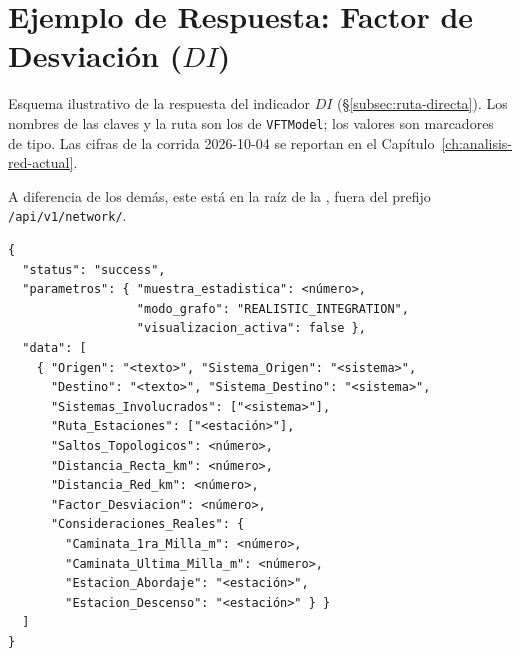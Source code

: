 
\section{Ejemplo de Respuesta: Factor de Desviación \texorpdfstring{($DI$)}{(DI)}}
\label{anx:vft-out-detour}

Esquema ilustrativo de la respuesta del indicador $DI$
(§\ref{subsec:ruta-directa}). Los nombres de las claves y la ruta son los
de \texttt{VFTModel}; los valores son marcadores de tipo. Las cifras de la
corrida 2026-10-04 se reportan en el Capítulo~\ref{ch:analisis-red-actual}.

A diferencia de los demás, este  está en la raíz de la \api{},
fuera del prefijo \texttt{/api/v1/network/}.

\begin{lstlisting}[style=estiloPython,
  caption={Esquema de respuesta del endpoint \texttt{/get\_detour\_factor}
           (ilustrativo; \texttt{visualize} = falso).},
  label=lst:out-detour]
{
  "status": "success",
  "parametros": { "muestra_estadistica": <número>,
                  "modo_grafo": "REALISTIC_INTEGRATION",
                  "visualizacion_activa": false },
  "data": [
    { "Origen": "<texto>", "Sistema_Origen": "<sistema>",
      "Destino": "<texto>", "Sistema_Destino": "<sistema>",
      "Sistemas_Involucrados": ["<sistema>"],
      "Ruta_Estaciones": ["<estación>"],
      "Saltos_Topologicos": <número>,
      "Distancia_Recta_km": <número>,
      "Distancia_Red_km": <número>,
      "Factor_Desviacion": <número>,
      "Consideraciones_Reales": {
        "Caminata_1ra_Milla_m": <número>,
        "Caminata_Ultima_Milla_m": <número>,
        "Estacion_Abordaje": "<estación>",
        "Estacion_Descenso": "<estación>" } }
  ]
}
\end{lstlisting}
